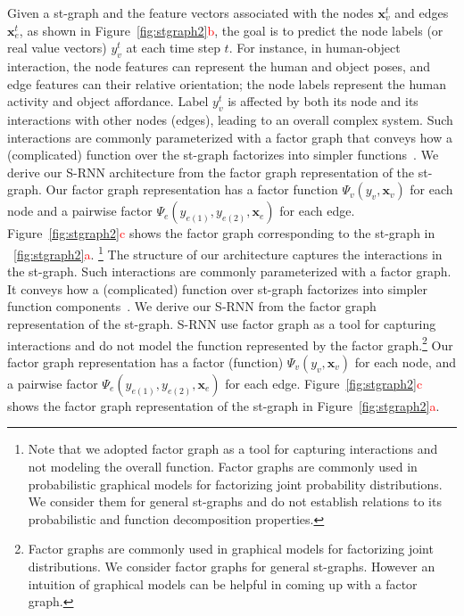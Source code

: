 \documentclass[10pt,twocolumn,letterpaper]{article}
\newcommand{\ve}[1]{\mathbf{#1}}
\newcommand{\rc}[1]{\textcolor{red}{#1}}
\begin{document}
Given a st-graph and the feature vectors associated with the nodes $\ve{x}_v^t$ and edges $\ve{x}_e^t$, as shown in Figure~\ref{fig:stgraph2}\rc{b}, the goal is to predict the node labels (or real value vectors) $y_v^t$ at each time step $t$. For instance, in human-object interaction, the node features can represent the human and object poses, and edge features can their relative orientation; the node labels represent the human activity and object affordance. 
Label $y_v^t$ is affected by both its node and its interactions with other nodes (edges), leading to an overall complex system.
Such interactions  are commonly parameterized with a factor graph that conveys how a (complicated) function over the st-graph factorizes into simpler functions~\cite{Kschischang01}.
We derive our S-RNN architecture from the factor graph representation of the st-graph. Our factor graph representation has a factor function $\Psi_v(y_v,\ve{x}_v)$ for each node and a pairwise factor $\Psi_e(y_{e(1)},y_{e(2)},\ve{x}_e)$ for each edge. Figure~\ref{fig:stgraph2}\rc{c} shows the factor graph corresponding to the st-graph in ~\ref{fig:stgraph2}\rc{a}. \footnote{Note that we adopted factor graph as a tool for capturing interactions and not modeling the overall function. Factor graphs are commonly used in probabilistic graphical models for factorizing joint probability distributions. We consider them for general st-graphs and do not establish relations to its probabilistic and function decomposition properties.}%
The structure of our architecture captures the interactions in the st-graph. Such interactions  are commonly parameterized with a factor graph. It conveys how a (complicated) function over st-graph factorizes into simpler function components~\cite{Kschischang01}.  We derive our S-RNN from the factor graph representation of the st-graph. S-RNN use factor graph as a tool for capturing interactions and do not model the function represented by the factor graph.\footnote{Factor graphs are commonly used in graphical models for factorizing joint distributions. We consider factor graphs for general st-graphs. However an intuition of graphical models can be helpful in coming up with a factor graph.} Our factor graph representation has a factor (function) $\Psi_v(y_v,\ve{x}_v)$ for each node, and a pairwise factor  $\Psi_e(y_{e(1)},y_{e(2)},\ve{x}_e)$ for each edge. Figure~\ref{fig:stgraph2}\rc{c} shows the factor graph representation of the st-graph in Figure~\ref{fig:stgraph2}\rc{a}.
\end{document}
